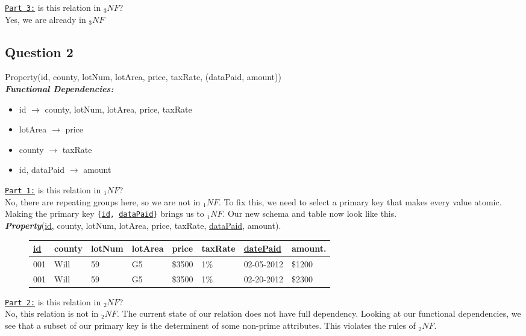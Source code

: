\documentclass[letterpaper, 11pt]{article}
\newcommand{\1}{\mathds{1}}	%
\theoremstyle{definition}
\begin{document}
\bigbreak \noindent
\underline{\texttt{Part 3:}} is this relation in $_3NF$? \\
Yes, we are already in $_3NF$
\begin{mdframed}
  
\subsection*{Question 2}
Property(id, county, lotNum, lotArea, price, taxRate, (dataPaid, amount)) \vspace{1.5mm} \\
\textit{\textbf{Functional Dependencies:}}
\begin{itemize}
    \item[\ding{228}]  id $\rightarrow$ county, lotNum, lotArea, price, taxRate
    \item[\ding{228}] lotArea $\rightarrow$ price
    \item[\ding{228}] county $\rightarrow$ taxRate
    \item[\ding{228}] id, dataPaid $\rightarrow$ amount
\end{itemize}
\end{mdframed}
\underline{\texttt{Part 1:}} is this relation in $_1NF$? \\
No, there are repeating groups here, so we are not in $_1NF$. To fix this,
we need to select a primary key that makes every value atomic.
\bigbreak \noindent
Making the primary key \texttt{\{\underline{id}, \underline{dataPaid}\}} brings us to $_1NF$. Our new schema and table now look like this. \\
\textit{\textbf{Property}}(\underline{id}, county, lotNum, lotArea, price, taxRate, \underline{dataPaid}, amount).
    \begin{figure}[H]
    \centering
    \begin{tabular}{l l l l l l l l}
        \hline
        \underline{id}& county& lotNum& lotArea& price& taxRate& \underline{datePaid}& amount. \\
        \hline
        001& Will & 59 & G5 & \$3500 &1\%& 02-05-2012& \$1200 \\
        001& Will & 59 & G5 & \$3500 &1\%& 02-20-2012& \$2300 \\
        \hline
    \end{tabular}
    \end{figure}
\bigbreak \noindent
\underline{\texttt{Part 2:}} is this relation in $_2NF$? \\
No, this relation is not in $_2NF$. The current state of our relation does not have full dependency. Looking at our functional dependencies, we see that a subset of our primary key is the determinent of some non-prime attributes. This violates the rules of $_2NF$. \vspace{2mm}\\
\end{document}
